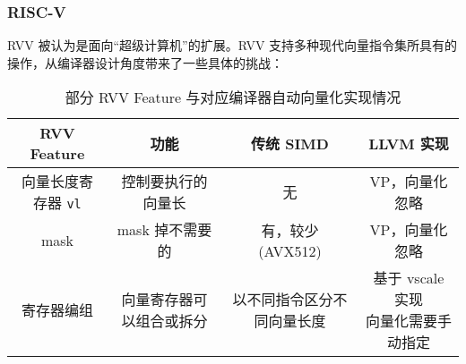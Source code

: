 \documentclass[aspectratio=169]{ctexbeamer}
\begin{document}
\begin{frame}
    \frametitle{RISC-V}

    RVV 被认为是面向``超级计算机''的扩展。RVV 支持多种现代向量指令集所具有的操作，从编译器设计角度带来了一些具体的挑战：

    \begin{table}
        \scriptsize
        \centering
        \caption{部分 RVV Feature 与对应编译器自动向量化实现情况}
        \begin{tabular}{cccc}
            \toprule
            RVV Feature         & 功能           & 传统 SIMD       & LLVM 实现             \\
            \midrule
            向量长度寄存器 \texttt{vl} & 控制要执行的向量长    & 无             & VP，向量化忽略            \\
            mask                & mask 掉不需要的   & 有，较少 (AVX512) & VP，向量化忽略            \\
            寄存器编组               & 向量寄存器可以组合或拆分 & 以不同指令区分不同向量长度 & \thead{基于 vscale 实现 \\ 向量化需要手动指定} \\
            \bottomrule
        \end{tabular}
    \end{table}

\end{frame}
\end{document}
